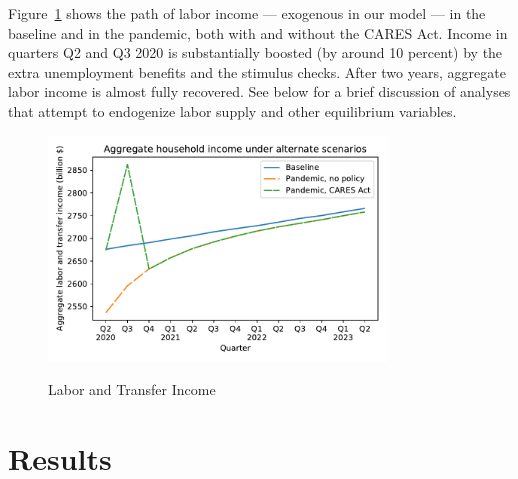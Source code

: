 \documentclass[titlepage,a4paper]{\econtex}
\begin{document}
\hypertarget{labor-income}{}
Figure~\ref{labor_income} shows the path of labor income --- exogenous in our model --- in the baseline and in the pandemic, both with and without the CARES Act.
Income in quarters Q2 and Q3 2020 is substantially boosted (by around 10 percent) by the extra unemployment benefits and the stimulus checks.
After two years, aggregate labor income is almost fully recovered.  See below for a brief discussion of analyses that attempt to endogenize labor supply and other equilibrium variables.

\begin{figure}
  \centering
  \caption{Labor and Transfer Income}
  \label{labor_income}
  { \includegraphics[width=0.8\textwidth]{./Figures/AggLT}}
\end{figure}


\hypertarget{Results}{}
\section{Results}
\end{document}
